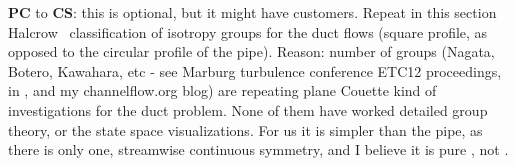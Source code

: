 		 {\label{exer:pathsDuct}
{\bf PC} to {\bf CS}:
 this is optional, but it might have customers. Repeat
in this section Halcrow \etal\ classification of isotropy
groups for the duct flows (square profile, as opposed to the
circular profile of the pipe). Reason: number of groups
(Nagata, Botero, Kawahara, etc - see Marburg turbulence
conference ETC12 proceedings, in ,
and my
      {channelflow.org blog})
are repeating plane Couette kind of investigations for the duct
problem. None of them have worked detailed group theory, or the
state space visualizations. For us it is simpler than the pipe,
as there is only one, streamwise continuous symmetry, and I
believe it is pure , not .
    } %
